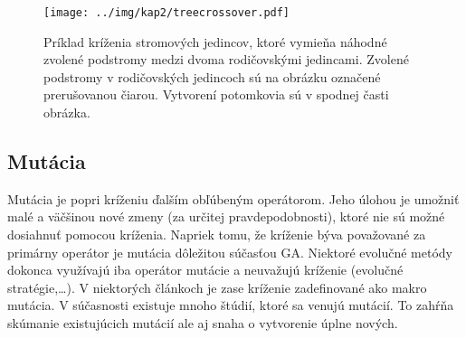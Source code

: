 \begin{figure}[h]
\centering
\centerline{\mbox{\texttt{[image: ../img/kap2/treecrossover.pdf]}}}
\caption{Príklad kríženia stromových jedincov, ktoré vymieňa náhodné zvolené podstromy medzi dvoma rodičovskými jedincami. Zvolené podstromy v rodičovských jedincoch sú na obrázku označené prerušovanou čiarou. Vytvorení potomkovia sú v spodnej časti obrázka.}\label{fig:TreeCrossover}
\end{figure}

\subsection{Mutácia}\label{kap2:2.5:2.5.1:Mutation}
Mutácia je popri kríženiu ďalším obľúbeným operátorom. Jeho úlohou je umožniť malé a väčšinou nové zmeny (za určitej pravdepodobnosti), ktoré nie sú možné dosiahnuť pomocou kríženia. Napriek tomu, že kríženie býva považované za primárny operátor je mutácia dôležitou súčasťou GA. Niektoré evolučné metódy dokonca využívajú iba operátor mutácie a neuvažujú kríženie (evolučné stratégie,\ldots). V niektorých článkoch je zase kríženie zadefinované ako makro mutácia. V súčasnosti existuje mnoho štúdií, ktoré sa venujú mutácií. To zahŕňa skúmanie existujúcich mutácií ale aj snaha o vytvorenie úplne nových. 

